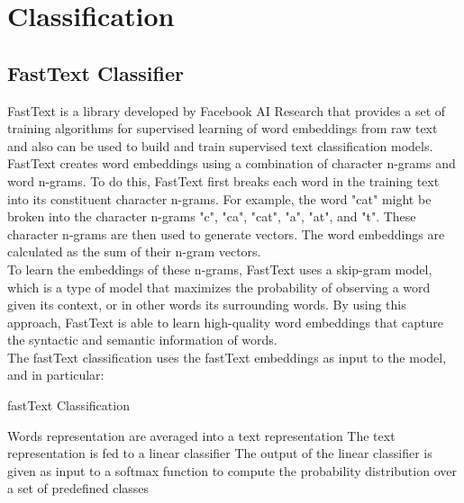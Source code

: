 \section{Classification}


\subsection{FastText Classifier}
FastText is a library developed by Facebook AI Research that provides a set of training algorithms for supervised learning of word embeddings from raw text and also can be used to build and train supervised text classification models. \\
FastText creates word embeddings using a combination of character n-grams and word n-grams. To do this, FastText first breaks each word in the training text into its constituent character n-grams. For example, the word "cat" might be broken into the character n-grams "c", "ca", "cat", "a", "at", and "t". These character n-grams are then used to generate vectors. The word embeddings are calculated as the sum of their n-gram vectors. \\
To learn the embeddings of these n-grams, FastText uses a skip-gram model, which is a type of model that maximizes the probability of observing a word given its context, or in other words its surrounding words. By using this approach, FastText is able to learn high-quality word embeddings that capture the syntactic and semantic information of words. \\
The fastText classification uses the fastText embeddings as input to the model, and in particular:
\begin{algorithm}
    \caption*{fastText Classification}
    \begin{algorithmic}[1]
      \State Words representation are averaged into a text representation
      \State The text representation is fed to a linear classifier
      \State The output of the linear classifier is given as input to a softmax function to compute the probability distribution over a set of predefined classes
    \end{algorithmic}
\end{algorithm}

